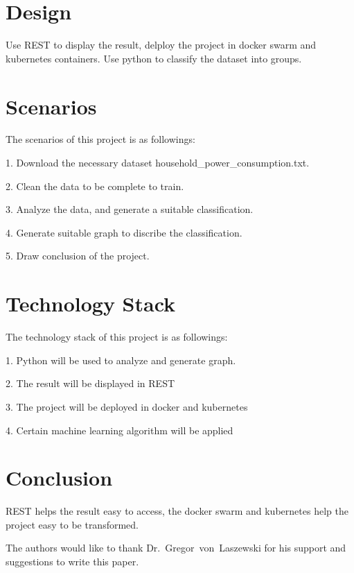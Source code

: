 \section{Design}

Use REST to display the result, delploy the project in docker swarm and kubernetes containers.
Use python to classify the dataset into groups.

\section{Scenarios}

The scenarios of this project is as followings:

1. Download the necessary dataset household\_power\_consumption.txt\cite{editor00}.

2. Clean the data to be complete to train.

3. Analyze the data, and generate a suitable classification.

4. Generate suitable graph to discribe the classification.

5. Draw conclusion of the project.


\section{Technology Stack}

The technology stack of this project is as followings:

1. Python will be used to analyze and generate graph.

2. The result will be displayed in REST

3. The project will be deployed in docker and kubernetes

4. Certain machine learning algorithm will be applied


\section{Conclusion}

REST helps the result easy to access, the docker swarm and kubernetes help the project easy to be transformed.


\begin{acks}

  The authors would like to thank Dr.~Gregor~von~Laszewski for his
  support and suggestions to write this paper.

\end{acks}



 

